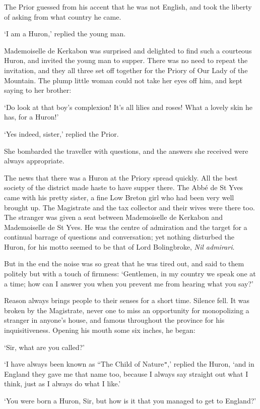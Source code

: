 \documentclass{article}
\begin{document}
\begin{center}
The Prior guessed from his accent that he was not English, and took the liberty 
of asking from what country he came. 

`I am a Huron,' replied the young man. 

Mademoiselle de Kerkabon was surprised and delighted to find such a courteous Huron, 
and invited the young man to supper. There was no need to repeat the invitation, 
and they all three set off together for the Priory of Our Lady of the Mountain. 
The plump little woman could not take her eyes off him, and kept saying to her 
brother: 

`Do look at that boy's complexion! It's all lilies and roses! What a lovely skin 
he has, for a Huron!' 

`Yes indeed, sister,' replied the Prior. 

She bombarded the traveller with questions, and the answers she received were always 
appropriate. 

The news that there was a Huron at the Priory spread quickly. All the best society 
of the district made haste to have supper there. The Abbé de St Yves came with 
his pretty sister, a fine Low Breton girl who had been very well brought up. The 
Magistrate and the tax collector and their wives were there too. The stranger was 
given a seat between Mademoiselle de Kerkabon and Mademoiselle de St Yves. He was 
the centre of admiration and the target for a continual barrage of questions and 
conversation; yet nothing disturbed the Huron, for his motto seemed to be that 
of Lord Bolingbroke, \textit{Nil admirari}. 

But in the end the noise was so great that he was tired out, and said to them politely 
but with a touch of firmness: `Gentlemen, in my country we speak one at a time; 
how can I answer you when you prevent me from hearing what you say?' 

Reason always brings people to their senses for a short time. Silence fell. It 
was broken by the Magistrate, never one to miss an opportunity for monopolizing 
a stranger in anyone's house, and famous throughout the province for his inquisitiveness. 
Opening his mouth some six inches, he began: 

`Sir, what are you called?' 

`I have always been known as ``The Child of Nature\texttt{"},' replied the Huron, 
`and in England they gave me that name too, because I always say straight out what 
I think, just as I always do what I like.' 

`You were born a Huron, Sir, but how is it that you managed to get to England?' 


\end{center}
\end{document}
